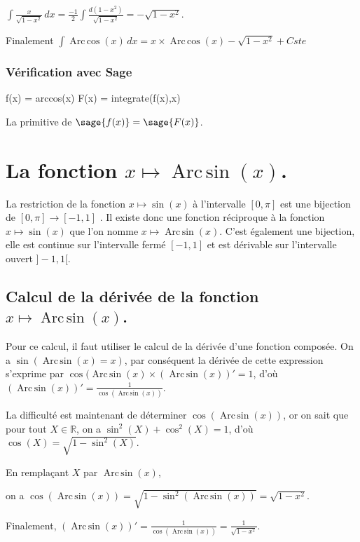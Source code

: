 \documentclass[a4paper,14pt]{extreport} %
\def\eclaire{\mathbb}
\def\R{\ensuremath{\eclaire R}}
\renewcommand{\arcsin}{\mathop{\mathrm{Arc\,sin}}}
\renewcommand{\arccos}{\mathop{\mathrm{Arc\,cos}}}
\begin{document}
$\int \frac{x}{\sqrt{1- x^2}} \, dx = \frac{-1}{2} \int \frac{d(1-x^2)}{\sqrt{1- x^2}}= -\sqrt{1- x^2} $.


Finalement $\int \arccos(x) \, dx = x \times \arccos(x) - \sqrt{1- x^2} + Cste $

\subsubsection*{Vérification avec Sage}

\begin{sageblock}
    f(x) = arccos(x)
    F(x) = integrate(f(x),x)
\end{sageblock}

La primitive de $\sage{f(x)} = \sage{F(x)} $.


\section{La fonction  $x \mapsto \arcsin(x) $.}

La restriction de la fonction $x \mapsto \sin(x) $ à l'intervalle $[0,\pi]$ est une bijection de $[0,\pi] \rightarrow [-1,1]$ . Il existe donc une fonction réciproque à la fonction $x \mapsto \sin(x) $ que l'on nomme $x \mapsto \arcsin(x) $. C'est également une bijection, elle est continue sur l'intervalle fermé  $ [-1,1]$ et est dérivable sur l'intervalle ouvert $]-1,1[$.



\subsection{Calcul de la dérivée de la fonction $x \mapsto \arcsin(x) $.}



Pour ce calcul, il faut utiliser le calcul de la dérivée d'une fonction composée. On a $\sin(\arcsin(x)=x)$, par conséquent la dérivée de cette expression s'exprime par $ \cos(\arcsin(x) \times (\arcsin(x))' = 1$, d'où $(\arcsin(x))' = \frac{1}{\cos(\arcsin(x))} $.

La difficulté est maintenant de déterminer $\cos(\arcsin(x))$, or on sait que pour tout $X \in \R$, on a $\sin^2(X) + \cos^2(X) = 1$, d'où $\cos(X) = \sqrt{1-\sin^2(X)}$.

En remplaçant $X$ par $\arcsin(x)$, 

on a $\cos(\arcsin(x)) = \sqrt{1-\sin^2(\arcsin(x))} = \sqrt{1- x^2}$.

Finalement, $(\arcsin(x))' = \frac{1}{\cos(\arcsin(x))} =  \frac{1}{\sqrt{1- x^2}} $.
\end{document}
